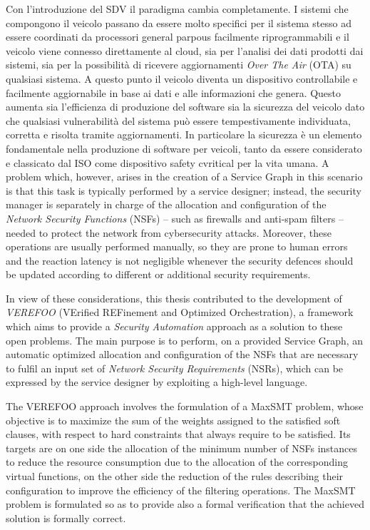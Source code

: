 \documentclass[10pt,a4paper,roman, twocolumn]{article}
\begin{document}
Con l'introduzione del SDV il paradigma cambia completamente. I sistemi che compongono il veicolo passano da essere molto specifici per il sistema stesso ad essere coordinati da processori general parpous facilmente riprogrammabili e il veicolo viene connesso direttamente al cloud, sia per l'analisi dei dati prodotti dai sistemi, sia per la possibilità di ricevere aggiornamenti  \textit{Over The Air} (OTA) su qualsiasi sistema. A questo punto il veicolo diventa un dispositivo controllabile e facilmente aggiornabile in base ai dati e alle informazioni che genera. Questo aumenta sia l'efficienza di produzione del software sia la sicurezza del veicolo dato che qualsiasi vulnerabilità del sistema può essere tempestivamente individuata, corretta e risolta tramite aggiornamenti. In particolare la sicurezza è un elemento fondamentale nella produzione di software per veicoli, tanto da essere considerato e classicato dal ISO come dispositivo safety cvritical per la vita umana.
A problem which, however, arises in the creation of a Service Graph in this scenario is that this task is typically performed by a service designer; instead, the security manager is separately in charge of the allocation and configuration of the \textit{Network Security Functions} (NSFs) -- such as firewalls and anti-spam filters -- needed to protect the network from cybersecurity attacks. Moreover, these operations are usually performed manually, so they are prone to human errors and the reaction latency is not negligible whenever the security defences should be updated according to different or additional security requirements.

In view of these considerations, this thesis contributed to the development of \textit{VEREFOO} (VErified REFinement and Optimized Orchestration), a framework which aims to provide a \textit{Security Automation} approach as a solution to these open problems. The main purpose is to perform, on a provided Service Graph, an automatic optimized allocation and configuration of the NSFs that are necessary to fulfil an input set of \textit{Network Security Requirements} (NSRs), which can be expressed by the service designer by exploiting a high-level language.

The VEREFOO approach involves the formulation of a MaxSMT problem, whose objective is to maximize the sum of the weights assigned to the satisfied soft clauses, with respect to hard constraints that always require to be satisfied. Its targets are on one side the allocation of the minimum number of NSFs instances to reduce the resource consumption due to the allocation of the corresponding virtual functions, on the other side the reduction of the rules describing their configuration to improve the efficiency of the filtering operations. The MaxSMT problem is formulated so as to provide also a formal verification that the achieved solution is formally correct.
\end{document}
